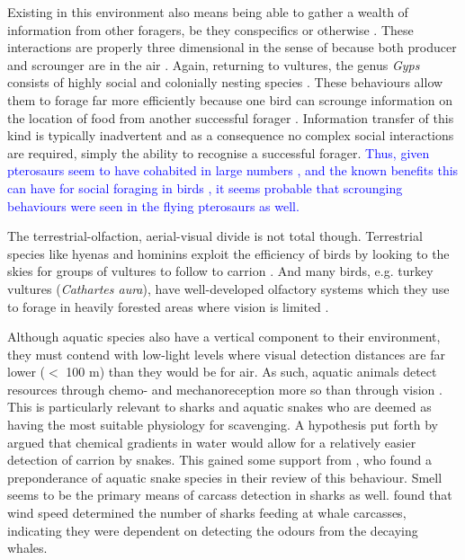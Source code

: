 \documentclass[a4paper,12pt]{article}
\begin{document}
Existing in this environment also means being able to gather a wealth of information from other foragers, be they conspecifics or otherwise \textcolor{blue}{\citep{jackson2008effect,KaneVul,moleon2014inter}}.
These interactions are properly three dimensional in the sense of \cite{pawar2012dimensionality} because both producer and scrounger are in the air \citep{dall2005information}. 
Again, returning to vultures, the genus \textit{Gyps} consists of highly social and colonially nesting species \citep{fernandez2015density}.
These behaviours allow them to forage far more efficiently because one bird can scrounge information on the location of food from another successful forager \textcolor{blue}{\citep{cortes2014bird}}.
Information transfer of this kind is typically inadvertent and as a consequence no complex social interactions are required, simply the ability to recognise a successful forager.
\textcolor{blue}{Thus, given pterosaurs seem to have cohabited in large numbers \citep{witton2013pterosaurs}, and the known benefits this can have for social foraging in birds \citep{jackson2011evolutionary}, it seems probable that scrounging behaviours were seen in the flying pterosaurs as well.} 

The terrestrial-olfaction, aerial-visual divide is not total though.
Terrestrial species like hyenas and hominins exploit the efficiency of birds by looking to the skies for groups of vultures to follow to carrion \citep{jones2015african,ruxton2013endurance}. 
And many birds, e.g. turkey vultures (\textit{Cathartes aura}), have well-developed olfactory systems \citep{AR:AR22815} which they use to forage in heavily forested areas where vision is limited \citep{houston1986olfaction}. 

Although aquatic species also have a vertical component to their environment, they must contend with low-light levels where visual detection distances are far lower ($<$ 100 m) than they would be for air.
As such, aquatic animals detect resources through chemo- and mechanoreception more so than through vision \citep{ruxton2004energetic}.
This is particularly relevant to sharks and aquatic snakes who are deemed as having the most suitable physiology for scavenging.
A hypothesis put forth by \cite{sazima1990necrofagia} argued that chemical gradients in water would allow for a relatively easier detection of carrion by snakes.
This gained some support from \cite{devault2002scavenging}, who found a preponderance of aquatic snake species in their review of this behaviour.
Smell seems to be the primary means of carcass detection in sharks as well. 
\cite{fallows2013white} found that wind speed determined the number of sharks feeding at whale carcasses, indicating they were dependent on detecting the odours from the decaying whales. 
\end{document}
